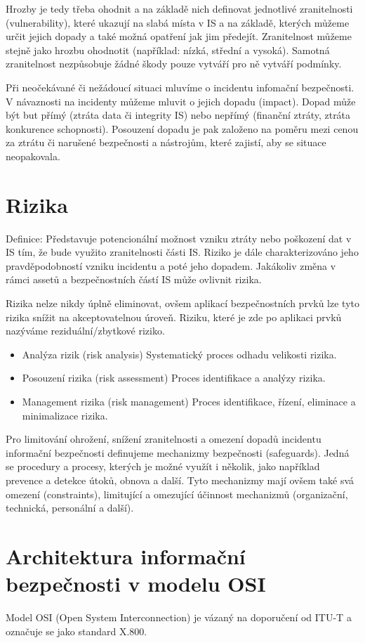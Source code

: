 \documentclass{szzclass}
\begin{document}
Hrozby je tedy třeba ohodnit a na základě nich definovat jednotlivé zranitelnosti (vulnerability), které ukazují na slabá místa v IS a na
základě, kterých můžeme určit jejich dopady a také možná opatření jak jim předejít. Zranitelnost můžeme stejně jako hrozbu ohodnotit
(například: nízká, střední a vysoká). Samotná zranitelnost nezpůsobuje žádné škody pouze vytváří pro ně vytváří podmínky.

Při neočekávané či nežádoucí situaci mluvíme o incidentu infomační bezpečnosti. V návaznosti na incidenty můžeme mluvit o jejich dopadu (impact).
Dopad může být but přímý (ztráta data či integrity IS) nebo nepřímý (finanční ztráty, ztráta konkurence schopnosti). Posouzení dopadu je pak založeno
na poměru mezi cenou za ztrátu či narušené bezpečnosti a nástrojům, které zajistí, aby se situace neopakovala.

\section{Rizika}

Definice: Představuje potencionální možnost vzniku ztráty nebo poškození dat v IS tím, že bude využito zranitelnosti části IS. Riziko je dále charakterizováno
jeho pravděpodobností vzniku incidentu a poté jeho dopadem. Jakákoliv změna v rámci assetů a bezpečnostních částí IS může ovlivnit rizika.

Rizika nelze nikdy úplně eliminovat, ovšem aplikací bezpečnostních prvků lze tyto rizika snížit na akceptovatelnou úroveň. Riziku, které je zde po aplikaci
prvků nazýváme reziduální/zbytkové riziko.

\begin{itemize}
    \item Analýza rizik (risk analysis)
          Systematický proces odhadu velikosti rizika.
    \item Posouzení rizika (risk assessment)
          Proces identifikace a analýzy rizika.
    \item Management rizika (risk management)
          Proces identifikace, řízení, eliminace a minimalizace rizika.
\end{itemize}

Pro limitování ohrožení, snížení zranitelnosti a omezení dopadů incidentu informační bezpečnosti definujeme mechanizmy bezpečnosti (safeguards).
Jedná se procedury a procesy, kterých je možné využít i několik, jako například prevence a detekce útoků, obnova a další.
Tyto mechanizmy mají ovšem také svá omezení (constraints), limitující a omezující účinnost mechanizmů (organizační, technická, personální a další).

\section{Architektura informační bezpečnosti v modelu OSI}

Model OSI (Open System Interconnection) je vázaný na doporučení od ITU-T a označuje se jako standard X.800.
\end{document}
